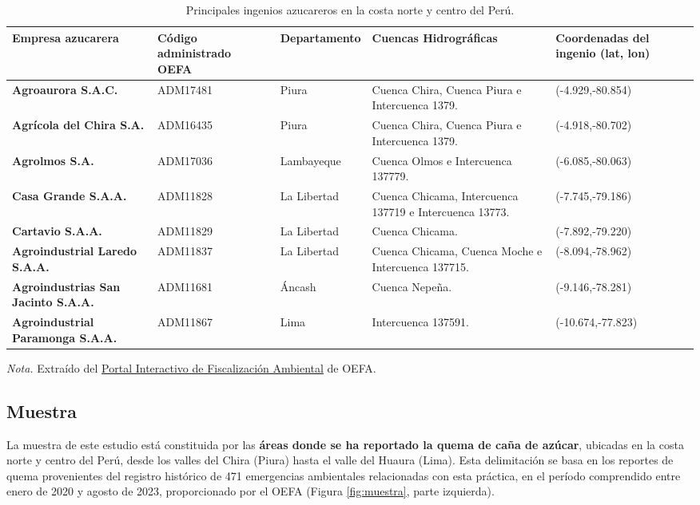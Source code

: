 \begin{table}[H]
    \centering
    \caption{Principales ingenios azucareros en la costa norte y centro del Perú.}
    \label{tab:ingenios}
    \begin{tabular}{p{3cm}p{2cm}p{2cm}p{4cm}p{3cm}}
        \hline
        \textbf{Empresa azucarera} & \textbf{Código administrado OEFA} & \textbf{Departamento} & \textbf{Cuencas Hidrográficas} & \textbf{Coordenadas del ingenio (lat, lon)} \\
        \hline
        \textbf{Agroaurora S.A.C.} & ADM17481 & Piura &  Cuenca Chira, Cuenca Piura e Intercuenca 1379. & (-4.929,-80.854) \\
        \textbf{Agrícola del Chira S.A.} & ADM16435 & Piura &  Cuenca Chira, Cuenca Piura e Intercuenca 1379. & (-4.918,-80.702) \\
        \textbf{Agrolmos S.A.} & ADM17036 & Lambayeque & Cuenca Olmos e Intercuenca 137779. & (-6.085,-80.063) \\       
        \textbf{Casa Grande S.A.A.} & ADM11828 & La Libertad & Cuenca Chicama, Intercuenca 137719 e Intercuenca 13773. & (-7.745,-79.186) \\
        \textbf{Cartavio S.A.A.} & ADM11829 & La Libertad & Cuenca Chicama. & (-7.892,-79.220) \\
        \textbf{Agroindustrial Laredo S.A.A.} & ADM11837 & La Libertad & Cuenca Chicama, Cuenca Moche e Intercuenca 137715. & (-8.094,-78.962) \\ 
        \textbf{Agroindustrias San Jacinto S.A.A.} & ADM11681 & Áncash & Cuenca Nepeña. & (-9.146,-78.281) \\
        \textbf{Agroindustrial Paramonga S.A.A.} & ADM11867 & Lima & Intercuenca 137591. & (-10.674,-77.823) \\
    \hline
    \end{tabular}
    \begin{flushleft}
        \textit{Nota.} Extraído del \href{https://sistemas.oefa.gob.pe/Portalpifa/IntervencionesUF.do}{Portal Interactivo de Fiscalización Ambiental} de OEFA.
        \vspace{-\baselineskip}
    \end{flushleft}    
\end{table}

\subsection{Muestra}
La muestra de este estudio está constituida por las \textbf{áreas donde se ha reportado la quema de caña de azúcar}, ubicadas en la costa norte y centro del Perú, desde los valles del Chira (Piura) hasta el valle del Huaura (Lima). Esta delimitación se basa en los reportes 
de quema provenientes del registro histórico de 471 emergencias ambientales relacionadas con esta práctica, en el período comprendido entre enero de 2020 y agosto 
de 2023, proporcionado por el OEFA (Figura \ref{fig:muestra}, parte 
izquierda).

